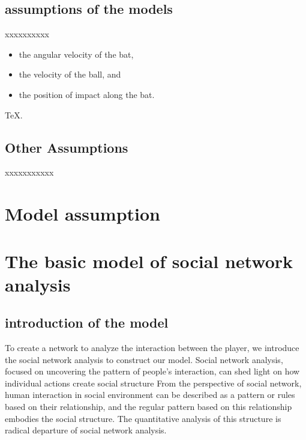 \documentclass{mcmthesis}
\begin{document}
\subsection{assumptions of the models}

xxxxxxxxxx
\begin{itemize}
\item the angular velocity of the bat,
\item the velocity of the ball, and
\item the position of impact along the bat.
\end{itemize}


\TeX .

\subsection{Other Assumptions}
xxxxxxxxxxx

\section{Model assumption}







\section{The basic model of social network analysis}
\subsection{introduction of the model}
To create a network to analyze the interaction between the player,
we introduce the social network analysis to construct our model.
Social network analysis, focused on uncovering the pattern of
people's interaction, can shed light on how individual actions create social structure
From the perspective of social network, human interaction in social
environment can be described as a pattern or rules based on their relationship, 
and the regular pattern based on this relationship embodies the social structure.
The quantitative analysis of this structure is radical departure of social 
network analysis.
\end{document}
